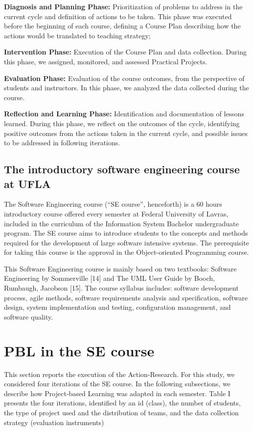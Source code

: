 \textbf{Diagnosis and Planning Phase:} Prioritization of problems to address in the current cycle and definition of actions to be taken. This phase was executed before the beginning of each course, defining a Course Plan describing how the actions would be translated to teaching strategy;

\textbf{Intervention Phase:} Execution of the Course Plan and data collection. During this phase, we assigned, monitored, and assessed Practical Projects.

\textbf{Evaluation Phase:} Evaluation of the course outcomes, from the perspective of students and instructors. In this phase, we analyzed the data collected during the course.

\textbf{Reflection and Learning Phase:} Identification and documentation of lessons learned. During this phase, we reflect on the outcomes of the cycle, identifying positive outcomes from the actions taken in the current cycle, and possible issues to be addressed in following iterations.

\subsection{The introductory software engineering course at UFLA}

The Software Engineering course (“SE course”, henceforth) is a 60 hours introductory course offered every semester at Federal University of Lavras, included in the curriculum of the Information System Bachelor undergraduate program. The SE course aims to introduce students to the concepts and methods required for the development of large software intensive systems. The prerequisite for taking this course is the approval in the Object-oriented Programming course.

This Software Engineering course is mainly based on two textbooks: Software Engineering by Sommerville [14] and The UML User Guide by Booch, Rumbaugh, Jacobson [15]. The course syllabus includes: software development process, agile methods, software requirements analysis and specification, software design, system implementation and testing, configuration management, and software quality.

\section{PBL in the SE course}

This section reports the execution of the Action-Research. For this study, we considered four iterations of the SE course. In the following subsections, we describe how Project-based Learning was adapted in each semester. Table I presents the four iterations, identified by an id (class), the number of students, the type of project used and the distribution of teams, and the data collection strategy (evaluation instruments)  

